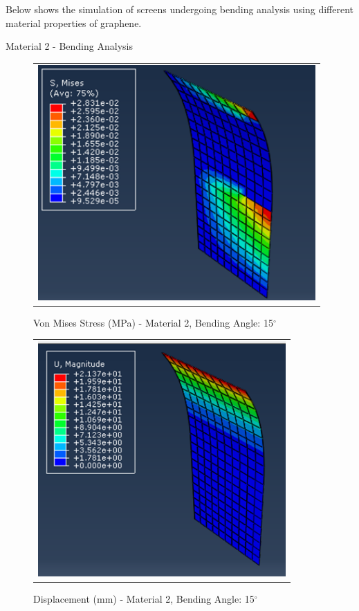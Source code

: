 \documentclass[a4paper,12pt]{article}
\numberwithin{equation}{section}
\numberwithin{figure}{section}
\begin{document}
\newpage 
\noindent Below shows the simulation of screens undergoing bending analysis using different material properties of graphene.\vspace{\baselineskip}


\noindent Material 2 - Bending Analysis 
\begin{figure}[H]
  \centering
  \begin{tabular}{@{}c@{}}
    \includegraphics[width=0.7\linewidth,height=255pt]{Results/Bending/M2_VMS_15.png} \\
  \end{tabular}
  \caption{Von Mises Stress (MPa) - Material 2,  Bending Angle: 15$^{\circ}$ }
\end{figure}

\begin{figure}[H]
  \centering
  \begin{tabular}{@{}c@{}}
    \includegraphics[width=0.7\linewidth,height=255pt]{Results/Bending/M2_DIS_15.png} \\
  \end{tabular}
  \caption{Displacement (mm) - Material 2, Bending Angle: 15$^{\circ}$ }
\end{figure}
\end{document}
